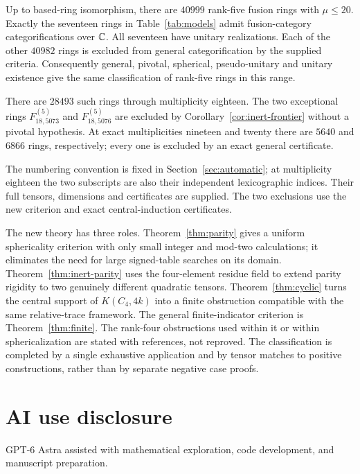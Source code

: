 \documentclass[11pt]{article}
\newcommand{\F}[2]{F^{(5)}_{#1,#2}}
\begin{document}
\begin{theorem}\label{thm:main}
Up to based-ring isomorphism, there are $40999$ rank-five fusion rings
with $\mu\le20$. Exactly the seventeen rings in
Table~\ref{tab:models} admit fusion-category categorifications over $\mathbb C$.
All seventeen have unitary realizations. Each of the other $40982$ rings
is excluded from general categorification by the supplied criteria.
Consequently general, pivotal, spherical, pseudo-unitary and unitary
existence give the same classification of rank-five rings in this range.

There are $28493$ such rings through multiplicity eighteen. The two
exceptional rings $\F{18}{5073}$ and $\F{18}{5076}$ are excluded by
Corollary~\ref{cor:inert-frontier} without a pivotal
hypothesis. At exact multiplicities nineteen and twenty there are
$5640$ and $6866$ rings, respectively; every one is excluded by an
exact general certificate.
\end{theorem}

The numbering convention is fixed in Section~\ref{sec:automatic}; at
multiplicity eighteen the two subscripts are also their independent
lexicographic indices. Their full tensors, dimensions and certificates
are supplied. The two exclusions use the new criterion and exact
central-induction certificates.

The new theory has three roles. Theorem~\ref{thm:parity} gives a uniform
sphericality criterion with only small integer and mod-two calculations;
it eliminates the need for large signed-table searches on its domain.
Theorem~\ref{thm:inert-parity} uses the four-element residue field to
extend parity rigidity to two genuinely different quadratic tensors.
Theorem~\ref{thm:cyclic} turns the central support of $K(C_4,4k)$ into a
finite obstruction compatible with the same relative-trace framework.
The general finite-indicator criterion is Theorem~\ref{thm:finite}.
The rank-four obstructions used within it or within sphericalization are
stated with references, not reproved. The classification is completed by
a single exhaustive application and by tensor matches to positive
constructions, rather than by separate negative case proofs.









\section*{AI use disclosure}
GPT-6 Astra assisted with mathematical exploration, code development, and manuscript preparation.

\end{document}
